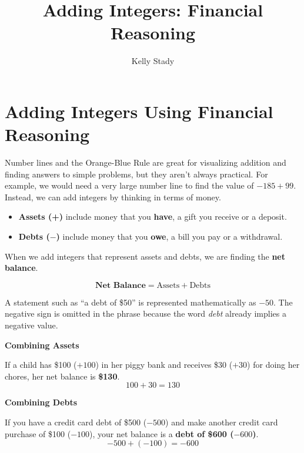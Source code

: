 \documentclass{ximera}[font=12pt]
\title{Adding Integers: Financial Reasoning}   %
\author{Kelly Stady}
\begin{document}
\begin{abstract}

\end{abstract}

\maketitle
\label{xim:AddIntMoneyActivity}


\section*{Adding Integers Using Financial Reasoning}

Number lines and the Orange-Blue Rule are great for visualizing addition and finding answers to simple problems, but they aren't 
always practical.  For example, we would need a very large number line to find the value of $-185 + 99.$  Instead, we can add 
integers by thinking in terms of money.


\begin{itemize}
\item \textbf{Assets (+)} include money that you \textbf{have}, a gift you receive or a deposit.

\item \textbf{Debts ($-$)} include money that you \textbf{owe}, a bill you pay or a withdrawal.

\end{itemize}


When we add integers that represent assets and debts, we are finding the \textbf{net balance}.

\[ \textbf{Net Balance} = \textrm{Assets} + \textrm{Debts} \]

\begin{remark}
A statement such as ``a debt of \$50'' is represented mathematically as $-50$. 
The negative sign is omitted in the phrase because the word \emph{debt} already implies a negative value.
\end{remark}

\begin{example}  \textcolor{glaucous}{\textbf{Combining Assets}} 
    
    If a child has \$100 ($+100$) in her piggy bank and receives \$30 ($+30$) for doing her chores, her net 
     balance is \textbf{\$130}.
    \[ 100 + 30 = 130 \]
\end{example}

\begin{example} \textcolor{glaucous}{\textbf{Combining Debts}} 
    
    If you have a credit card debt of \$500 ($-500$) and make another credit card purchase of 
    \$100 ($-100$), your net balance is a \textbf{debt of \$600 ($-600$)}.
    \[ -500 + (-100) = -600 \]
\end{example}
\end{document}
